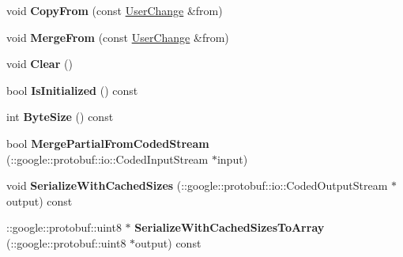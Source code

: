 \begin{DoxyCompactItemize}
\item 
\hypertarget{classSimpleChat_1_1UserChange_a96f9d6b6aef9b69a2c5061aefcace76e}{void {\bfseries Copy\-From} (const \hyperlink{classSimpleChat_1_1UserChange}{User\-Change} \&from)}\label{classSimpleChat_1_1UserChange_a96f9d6b6aef9b69a2c5061aefcace76e}

\item 
\hypertarget{classSimpleChat_1_1UserChange_a9df766794ff5648f206c9647fac83584}{void {\bfseries Merge\-From} (const \hyperlink{classSimpleChat_1_1UserChange}{User\-Change} \&from)}\label{classSimpleChat_1_1UserChange_a9df766794ff5648f206c9647fac83584}

\item 
\hypertarget{classSimpleChat_1_1UserChange_a4157339eb9cf75c110b41b6c27e58b06}{void {\bfseries Clear} ()}\label{classSimpleChat_1_1UserChange_a4157339eb9cf75c110b41b6c27e58b06}

\item 
\hypertarget{classSimpleChat_1_1UserChange_af3b596da94708ece2b51f080b30f7ef6}{bool {\bfseries Is\-Initialized} () const }\label{classSimpleChat_1_1UserChange_af3b596da94708ece2b51f080b30f7ef6}

\item 
\hypertarget{classSimpleChat_1_1UserChange_a6285488acc38fac76c544babde9b3d23}{int {\bfseries Byte\-Size} () const }\label{classSimpleChat_1_1UserChange_a6285488acc38fac76c544babde9b3d23}

\item 
\hypertarget{classSimpleChat_1_1UserChange_ac39dca4e2b592c5e3ac259cfe01e079d}{bool {\bfseries Merge\-Partial\-From\-Coded\-Stream} (\-::google\-::protobuf\-::io\-::\-Coded\-Input\-Stream $\ast$input)}\label{classSimpleChat_1_1UserChange_ac39dca4e2b592c5e3ac259cfe01e079d}

\item 
\hypertarget{classSimpleChat_1_1UserChange_a35fe2d61b97ff6c1cd56bf5f7b2a814b}{void {\bfseries Serialize\-With\-Cached\-Sizes} (\-::google\-::protobuf\-::io\-::\-Coded\-Output\-Stream $\ast$output) const }\label{classSimpleChat_1_1UserChange_a35fe2d61b97ff6c1cd56bf5f7b2a814b}

\item 
\hypertarget{classSimpleChat_1_1UserChange_a5f6381739d9614534ac32d6e62eed4b8}{\-::google\-::protobuf\-::uint8 $\ast$ {\bfseries Serialize\-With\-Cached\-Sizes\-To\-Array} (\-::google\-::protobuf\-::uint8 $\ast$output) const }\label{classSimpleChat_1_1UserChange_a5f6381739d9614534ac32d6e62eed4b8}


\end{DoxyCompactItemize}
